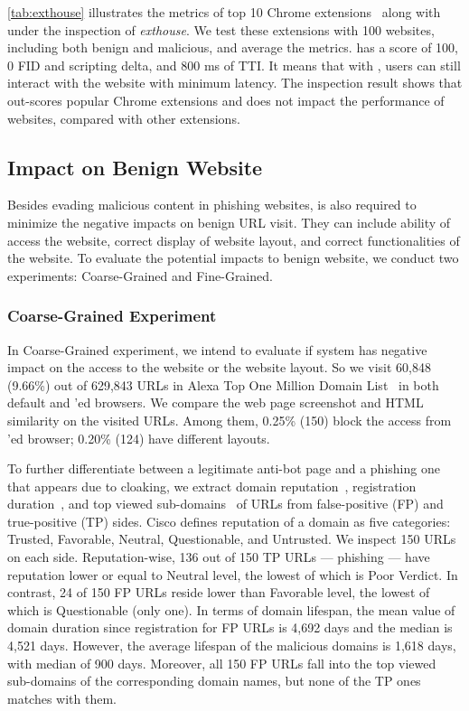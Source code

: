 \exthouse

\autoref{tab:exthouse} illustrates the metrics of top 10 Chrome extensions~\cite{exthouse} along with \spartacus under the inspection of \emph{exthouse}.
We test these extensions with 100 websites, including both benign and malicious, and average the metrics.
\spartacus has a score of 100, 0 FID and scripting delta, and 800 ms of TTI.
It means that with \spartacus, users can still interact with the website with minimum latency.
The inspection result shows that \spartacus out-scores popular Chrome extensions and does not impact the performance of websites, compared with other extensions.

\subsection{Impact on Benign Website}

Besides evading malicious content in phishing websites, \spartacus is also required to minimize the negative impacts on benign URL visit.
They can include ability of access the website, correct display of website layout, and correct functionalities of the website.
To evaluate the potential impacts to benign website, we conduct two experiments: Coarse-Grained and Fine-Grained.

\subsubsection{Coarse-Grained Experiment}

In Coarse-Grained experiment, we intend to evaluate if \spartacus system has negative impact on the access to the website or the website layout.
So we visit 60,848 (9.66\%) out of 629,843 URLs in Alexa Top One Million Domain List~\cite{AlexaTop1M} in both default and \spartacus'ed browsers.
We compare the web page screenshot and HTML similarity on the visited URLs.
Among them, 0.25\% (150) block the access from \spartacus'ed browser;
0.20\% (124) have different layouts.

To further differentiate between a legitimate anti-bot page and a phishing one that appears due to cloaking,
we extract domain reputation~\cite{reputation}, registration duration~\cite{whois}, and top viewed sub-domains~\cite{topviewedsubdomains} of URLs from false-positive (FP) and true-positive (TP) sides.
Cisco defines reputation of a domain as five categories: Trusted, Favorable, Neutral, Questionable, and Untrusted.
We inspect 150 URLs on each side.
Reputation-wise, 136 out of 150 TP URLs --- phishing --- have reputation lower or equal to Neutral level, the lowest of which is Poor Verdict.
In contrast, 24 of 150 FP URLs reside lower than Favorable level, the lowest of which is Questionable (only one).
In terms of domain lifespan, the mean value of domain duration since registration for FP URLs is 4,692 days and the median is 4,521 days.
However, the average lifespan of the malicious domains is 1,618 days, with median of 900 days.
Moreover, all 150 FP URLs fall into the top viewed sub-domains of the corresponding domain names, but none of the TP ones matches with them.

